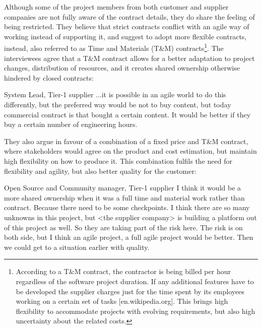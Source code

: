 Although some of the project members from both customer and supplier companies are not fully aware of the contract details, they do share the feeling of being restricted. 
%
%
They believe that strict contracts conflict with an agile way of working instead of supporting it, and suggest to adopt more flexible contracts, instead, also referred to as Time and Materials (T\&M) contracts\footnote{According to a T\&M contract, the contractor is being billed per hour regardless of the software project duration. If any additional features have to be developed the supplier charges just for the time spent by its employees working on a certain set of tasks [en.wikipedia.org]. This brings high flexibility to accommodate projects with evolving requirements, but also high uncertainty about the related costs.}. 
The interviewees agree that a T\&M contract allows for a better adaptation to project changes, distribution of resources, and it creates shared ownership otherwise hindered by closed contracts:

\begin{aquote}{System Lead, Tier-1 supplier}
...it is possible in an agile world to do this differently, but the preferred way would be not to buy content, but today commercial contract is that bought a certain content. It would be better if they buy a certain number of engineering hours.
\end{aquote}

They also argue in favour of a combination of a fixed price and T\&M contract, where stakeholders would agree on the product and cost estimation, but maintain high flexibility on how to produce it. This combination fulfils the need for flexibility and agility, but also better quality for the customer:

\begin{aquote}{Open Source and Community manager, Tier-1 supplier}
I think it would be a more shared ownership when it was a full time and material work rather than contract. Because there need to be some checkpoints. I think there are so many unknowns in this project, but <the supplier company> is building a platform out of this project as well. So they are taking part of the risk here. The risk is on both side, but I think an agile project, a full agile project would be better. Then we could get to a situation earlier with quality.
\end{aquote}

